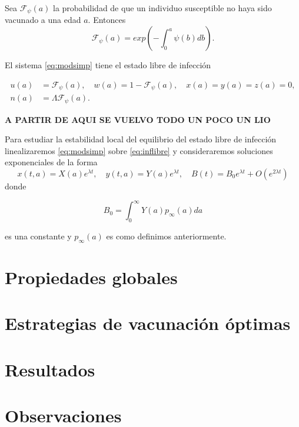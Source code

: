 \documentclass[
]{book}
\begin{document}
Sea \(\mathscr{F}_\psi (a)\) la probabilidad de que un individuo susceptible no haya sido vacunado a una edad \(a\). Entonces
\[\mathscr{F}_\psi (a) = exp\left(-\int_0^a \psi(b) db \right).\]

El sistema \eqref{eq:modsimp} tiene el estado libre de infección

\begin{equation}
\begin{split}
u(a) &= \mathscr{F}_\psi (a), \quad w(a) = 1 - \mathscr{F}_\psi (a), \quad x(a) = y(a) = z(a) = 0, \\
n(a) &= \Lambda \mathscr{F}_\psi (a).
\end{split}
\label{eq:inflibre}
\end{equation}

\textbf{A PARTIR DE AQUI SE VUELVO TODO UN POCO UN LIO}

Para estudiar la estabilidad local del equilibrio del estado libre de infección linealizaremos \eqref{eq:modsimp} sobre \eqref{eq:inflibre} y consideraremos soluciones exponenciales de la forma
\[x(t,a) = X(a)e^{\lambda t}, \quad y(t,a) = Y(a)e^{\lambda t}, \quad B(t) = B_0e^{\lambda t}
                                                                            + O(e^{2\lambda t})\]
donde

\begin{equation}
B_0 = \int_0^\infty Y(a) p_\infty(a) da
\label{eq:B0}
\end{equation}

es una constante y \(p_\infty (a)\) es como definimos anteriormente.

\hypertarget{sec4}{%
\section{Propiedades globales}\label{sec4}}

\hypertarget{sec5}{%
\section{Estrategias de vacunación óptimas}\label{sec5}}

\hypertarget{sec6}{%
\section{Resultados}\label{sec6}}

\hypertarget{observaciones}{%
\section*{Observaciones}\label{observaciones}}
\end{document}
